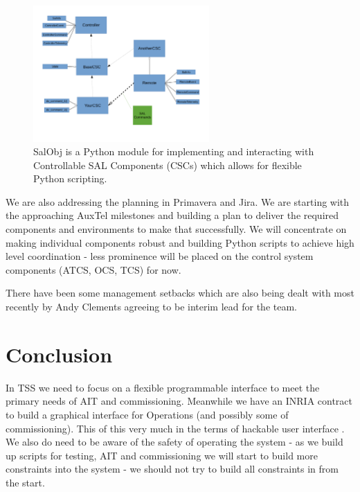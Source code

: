 \begin{figure}
\begin{center}
\includegraphics[width=0.6\textwidth]{SalobjClassDiag2}
\caption{SalObj is a Python module for implementing and interacting with Controllable SAL Components (CSCs) which allows for
flexible Python scripting. \label{fig:sal}}
\end{center}
\end{figure}


We are also addressing the planning in Primavera and Jira. We are starting with the approaching AuxTel milestones and building a plan to deliver the required components and environments to make that successfully.
We will concentrate on making individual components robust and building Python scripts to achieve high level coordination - less prominence will be placed on the control system components (ATCS, OCS, TCS)  for now.

There have been some management setbacks which are also being dealt with most recently by Andy Clements agreeing to be interim lead for  the team.

\section{Conclusion}
In TSS we need to focus on a flexible programmable interface to meet the  primary needs of AIT and commissioning.
Meanwhile we have an INRIA contract to build a graphical interface for Operations (and possibly some of commissioning).
This of this very much in the terms of hackable user interface \citep{2015ASPC..495..101B}.
We also do need to be aware of the safety of operating the system - as we build up scripts for testing, AIT and commissioning we will start to build more constraints into the system - we should not try to build all constraints in from the start.


